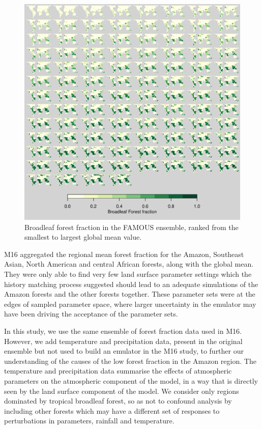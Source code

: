 \documentclass[gmd, manuscript]{copernicus}
\begin{document}
\begin{figure}[t]
\includegraphics[width=12cm]{../graphics/tropics_maps_yg.pdf}
\caption{Broadleaf forest fraction in the FAMOUS ensemble, ranked from the smallest to largest global mean value.}
\label{fig:tropics_maps_yg}
\end{figure}


M16 aggregated the regional mean forest fraction for the Amazon, Southeast Asian, North American and central African forests, along with the global mean. They were only able to find very few land surface parameter settings which the history matching process suggested should lead to an adequate simulations of the Amazon forests and the other forests together. These parameter sets were at the edges of sampled parameter space, where larger uncertainty in the emulator may have been driving the acceptance of the parameter sets. 
 
In this study, we use the same ensemble of forest fraction data used in M16. However, we add temperature and precipitation data, present in the original ensemble but not used to build an emulator in the M16 study, to further our understanding of the causes of the low forest fraction in the Amazon region. The temperature and precipitation data summarise the effects of atmospheric parameters on the atmospheric component of the model, in a way that is directly seen by the land surface component of the model. We consider only regions dominated by tropical broadleaf forest, so as not to confound analysis by including other forests which may have a different set of responses to perturbations in parameters, rainfall and temperature.
\end{document}
